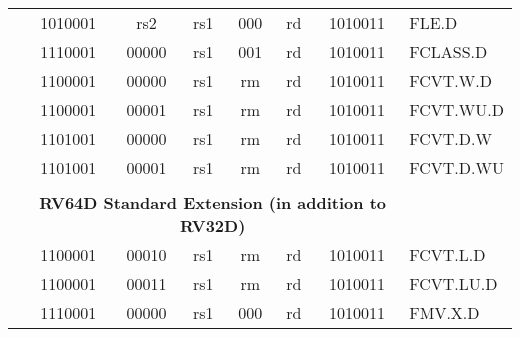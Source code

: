 \begin{table}[p]
\begin{small}
\begin{center}
\begin{tabular}{p{0in}p{0.4in}p{0.05in}p{0.05in}p{0.05in}p{0.05in}p{0.4in}p{0.6in}p{0.4in}p{0.6in}p{0.7in}l}
&
\multicolumn{4}{|c|}{1010001} &
\multicolumn{2}{c|}{rs2} &
\multicolumn{1}{c|}{rs1} &
\multicolumn{1}{c|}{000} &
\multicolumn{1}{c|}{rd} &
\multicolumn{1}{c|}{1010011} & FLE.D \\
\cline{2-11}
  

&
\multicolumn{4}{|c|}{1110001} &
\multicolumn{2}{c|}{00000} &
\multicolumn{1}{c|}{rs1} &
\multicolumn{1}{c|}{001} &
\multicolumn{1}{c|}{rd} &
\multicolumn{1}{c|}{1010011} & FCLASS.D \\
\cline{2-11}
  

&
\multicolumn{4}{|c|}{1100001} &
\multicolumn{2}{c|}{00000} &
\multicolumn{1}{c|}{rs1} &
\multicolumn{1}{c|}{rm} &
\multicolumn{1}{c|}{rd} &
\multicolumn{1}{c|}{1010011} & FCVT.W.D \\
\cline{2-11}
  

&
\multicolumn{4}{|c|}{1100001} &
\multicolumn{2}{c|}{00001} &
\multicolumn{1}{c|}{rs1} &
\multicolumn{1}{c|}{rm} &
\multicolumn{1}{c|}{rd} &
\multicolumn{1}{c|}{1010011} & FCVT.WU.D \\
\cline{2-11}
  

&
\multicolumn{4}{|c|}{1101001} &
\multicolumn{2}{c|}{00000} &
\multicolumn{1}{c|}{rs1} &
\multicolumn{1}{c|}{rm} &
\multicolumn{1}{c|}{rd} &
\multicolumn{1}{c|}{1010011} & FCVT.D.W \\
\cline{2-11}
  

&
\multicolumn{4}{|c|}{1101001} &
\multicolumn{2}{c|}{00001} &
\multicolumn{1}{c|}{rs1} &
\multicolumn{1}{c|}{rm} &
\multicolumn{1}{c|}{rd} &
\multicolumn{1}{c|}{1010011} & FCVT.D.WU \\
\cline{2-11}
  

&
\multicolumn{10}{c}{} & \\
&
\multicolumn{10}{c}{\bf RV64D Standard Extension (in addition to RV32D)} & \\
\cline{2-11}
  

&
\multicolumn{4}{|c|}{1100001} &
\multicolumn{2}{c|}{00010} &
\multicolumn{1}{c|}{rs1} &
\multicolumn{1}{c|}{rm} &
\multicolumn{1}{c|}{rd} &
\multicolumn{1}{c|}{1010011} & FCVT.L.D \\
\cline{2-11}
  

&
\multicolumn{4}{|c|}{1100001} &
\multicolumn{2}{c|}{00011} &
\multicolumn{1}{c|}{rs1} &
\multicolumn{1}{c|}{rm} &
\multicolumn{1}{c|}{rd} &
\multicolumn{1}{c|}{1010011} & FCVT.LU.D \\
\cline{2-11}
  

&
\multicolumn{4}{|c|}{1110001} &
\multicolumn{2}{c|}{00000} &
\multicolumn{1}{c|}{rs1} &
\multicolumn{1}{c|}{000} &
\multicolumn{1}{c|}{rd} &
\multicolumn{1}{c|}{1010011} & FMV.X.D \\
\cline{2-11}
  


\end{tabular}
\end{center}
\end{small}
\end{table}
